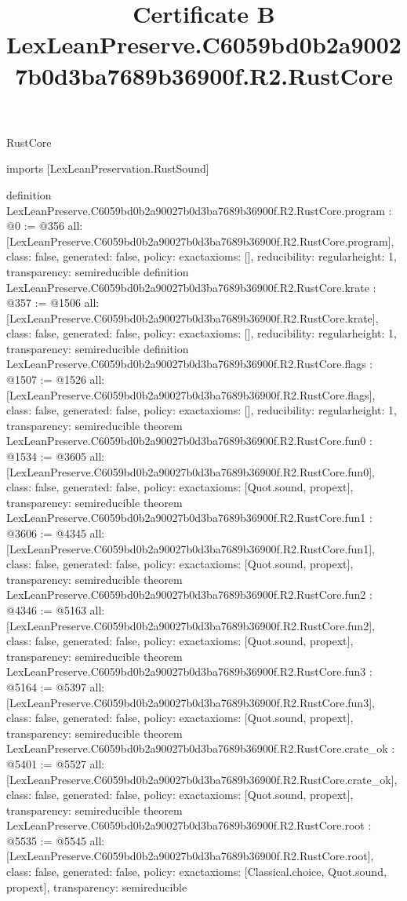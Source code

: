 \begin{lexlean}{RustCore}
\title{Certificate B LexLeanPreserve.C6059bd0b2a90027b0d3ba7689b36900f.R2.RustCore}
\begin{coremodule}
imports [LexLeanPreservation.RustSound]

definition LexLeanPreserve.C6059bd0b2a90027b0d3ba7689b36900f.R2.RustCore.program : @0 := @356 {
  all: [LexLeanPreserve.C6059bd0b2a90027b0d3ba7689b36900f.R2.RustCore.program],
  class: false,
  generated: false,
  policy: exact{axioms: []},
  reducibility: regular{height: 1},
  transparency: semireducible
}
definition LexLeanPreserve.C6059bd0b2a90027b0d3ba7689b36900f.R2.RustCore.krate : @357 := @1506 {
  all: [LexLeanPreserve.C6059bd0b2a90027b0d3ba7689b36900f.R2.RustCore.krate],
  class: false,
  generated: false,
  policy: exact{axioms: []},
  reducibility: regular{height: 1},
  transparency: semireducible
}
definition LexLeanPreserve.C6059bd0b2a90027b0d3ba7689b36900f.R2.RustCore.flags : @1507 := @1526 {
  all: [LexLeanPreserve.C6059bd0b2a90027b0d3ba7689b36900f.R2.RustCore.flags],
  class: false,
  generated: false,
  policy: exact{axioms: []},
  reducibility: regular{height: 1},
  transparency: semireducible
}
theorem LexLeanPreserve.C6059bd0b2a90027b0d3ba7689b36900f.R2.RustCore.fun0 : @1534 := @3605 {
  all: [LexLeanPreserve.C6059bd0b2a90027b0d3ba7689b36900f.R2.RustCore.fun0],
  class: false,
  generated: false,
  policy: exact{axioms: [Quot.sound, propext]},
  transparency: semireducible
}
theorem LexLeanPreserve.C6059bd0b2a90027b0d3ba7689b36900f.R2.RustCore.fun1 : @3606 := @4345 {
  all: [LexLeanPreserve.C6059bd0b2a90027b0d3ba7689b36900f.R2.RustCore.fun1],
  class: false,
  generated: false,
  policy: exact{axioms: [Quot.sound, propext]},
  transparency: semireducible
}
theorem LexLeanPreserve.C6059bd0b2a90027b0d3ba7689b36900f.R2.RustCore.fun2 : @4346 := @5163 {
  all: [LexLeanPreserve.C6059bd0b2a90027b0d3ba7689b36900f.R2.RustCore.fun2],
  class: false,
  generated: false,
  policy: exact{axioms: [Quot.sound, propext]},
  transparency: semireducible
}
theorem LexLeanPreserve.C6059bd0b2a90027b0d3ba7689b36900f.R2.RustCore.fun3 : @5164 := @5397 {
  all: [LexLeanPreserve.C6059bd0b2a90027b0d3ba7689b36900f.R2.RustCore.fun3],
  class: false,
  generated: false,
  policy: exact{axioms: [Quot.sound, propext]},
  transparency: semireducible
}
theorem LexLeanPreserve.C6059bd0b2a90027b0d3ba7689b36900f.R2.RustCore.crate_ok : @5401 := @5527 {
  all: [LexLeanPreserve.C6059bd0b2a90027b0d3ba7689b36900f.R2.RustCore.crate_ok],
  class: false,
  generated: false,
  policy: exact{axioms: [Quot.sound, propext]},
  transparency: semireducible
}
theorem LexLeanPreserve.C6059bd0b2a90027b0d3ba7689b36900f.R2.RustCore.root : @5535 := @5545 {
  all: [LexLeanPreserve.C6059bd0b2a90027b0d3ba7689b36900f.R2.RustCore.root],
  class: false,
  generated: false,
  policy: exact{axioms: [Classical.choice, Quot.sound, propext]},
  transparency: semireducible
}


\end{coremodule}
\end{lexlean}
